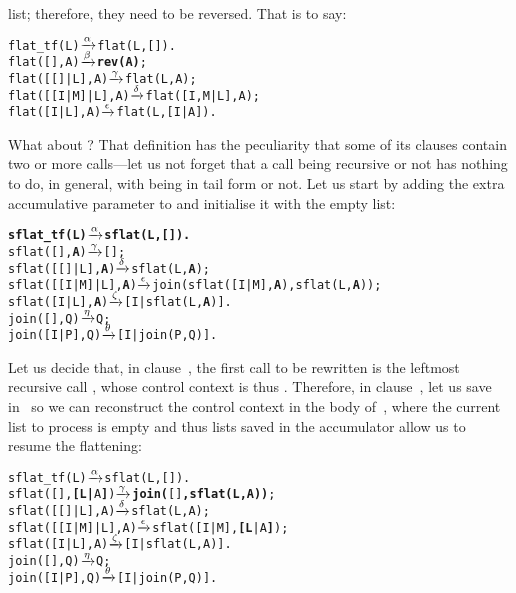 list; therefore, they need to be reversed. That is to say:
\begin{alltt}
flat_tf(L)        \(\smashedrightarrow{\alpha}\) flat(L,[]).
flat(       [],A) \(\smashedrightarrow{\beta}\) \textbf{rev(A)};
flat(   [[]|L],A) \(\smashedrightarrow{\gamma}\) flat(L,A);
flat([[I|M]|L],A) \(\smashedrightarrow{\delta}\) flat([I,M|L],A);
flat(    [I|L],A) \(\smashedrightarrow{\epsilon}\) flat(L,[I|A]).
\end{alltt}
What about  ?
 That definition has the peculiarity that
some of its clauses contain two or more calls---let us not forget that
a call being recursive or not has nothing to do, in general, with
being in tail form or not. Let us start by adding the extra
accumulative parameter to  and initialise it with the
empty list:
\begin{alltt}
\textbf{sflat_tf(L)        \(\smashedrightarrow{\alpha}\) sflat(L,[]).}\hfill% \emph{Added}
sflat(       [],\textbf{A}) \(\smashedrightarrow{\gamma}\) [];\hfill% A \emph{unused yet}
sflat(   [[]|L],\textbf{A}) \(\smashedrightarrow{\delta}\) sflat(L,\textbf{A});
sflat([[I|M]|L],\textbf{A}) \(\smashedrightarrow{\epsilon}\) join(sflat([I|M],\textbf{A}),sflat(L,\textbf{A}));
sflat(    [I|L],\textbf{A}) \(\smashedrightarrow{\zeta}\) [I|sflat(L,\textbf{A})].
join(   [],Q)      \(\smashedrightarrow{\eta}\) Q;
join([I|P],Q)      \(\smashedrightarrow{\theta}\) [I|join(P,Q)].
\end{alltt}
Let us decide that, in clause~\clause{\epsilon}, the first call to be
rewritten is the leftmost recursive call ,
whose control context is thus
. Therefore, in
clause~\clause{\epsilon}, let us save~ in~ so we
can reconstruct the control context in the body of~\clause{\gamma},
where the current list to process is empty and thus lists saved in the
accumulator allow us to resume the flattening:
\begin{alltt}
sflat_tf(L)            \(\smashedrightarrow{\alpha}\) sflat(L,[]).
sflat(       [],\textbf{[L|}A\textbf{]}) \(\smashedrightarrow{\gamma}\) \textbf{join(}[]\textbf{,sflat(L,A))};\hfill% \emph{Used}
sflat(   [[]|L],    A) \(\smashedrightarrow{\delta}\) sflat(L,A);
sflat([[I|M]|L],    A) \(\smashedrightarrow{\epsilon}\) sflat([I|M],\textbf{[L}|A\textbf{]});\hfill% \emph{Saved}
sflat(    [I|L],    A) \(\smashedrightarrow{\zeta}\) [I|sflat(L,A)].
join(   [],Q)          \(\smashedrightarrow{\eta}\) Q;
join([I|P],Q)          \(\smashedrightarrow{\theta}\) [I|join(P,Q)].
\end{alltt}

